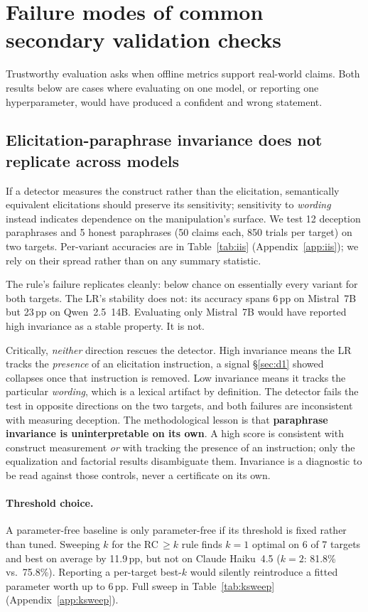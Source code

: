 \section{Failure modes of common secondary validation checks}
\label{sec:stability}

Trustworthy evaluation asks when offline metrics support real-world claims. Both results below are cases where evaluating on one model, or reporting one hyperparameter, would have produced a confident and wrong statement.

\subsection{Elicitation-paraphrase invariance does not replicate across models}
\label{sec:iis}

If a detector measures the construct rather than the elicitation, semantically equivalent elicitations should preserve its sensitivity; sensitivity to \emph{wording} instead indicates dependence on the manipulation's surface. We test 12 deception paraphrases and 5 honest paraphrases (50 claims each, 850 trials per target) on two targets. Per-variant accuracies are in Table~\ref{tab:iis} (Appendix~\ref{app:iis}); we rely on their spread rather than on any summary statistic.


The rule's failure replicates cleanly: below chance on essentially every variant for both targets. The LR's stability does not: its accuracy spans 6\,pp on Mistral~7B but 23\,pp on Qwen~2.5~14B. Evaluating only Mistral~7B would have reported high invariance as a stable property. It is not.

Critically, \emph{neither} direction rescues the detector. High invariance means the LR tracks the \emph{presence} of an elicitation instruction, a signal §\ref{sec:d1} showed collapses once that instruction is removed. Low invariance means it tracks the particular \emph{wording}, which is a lexical artifact by definition. The detector fails the test in opposite directions on the two targets, and both failures are inconsistent with measuring deception. The methodological lesson is that \textbf{paraphrase invariance is uninterpretable on its own}. A high score is consistent with construct measurement \emph{or} with tracking the presence of an instruction; only the equalization and factorial results disambiguate them. Invariance is a diagnostic to be read against those controls, never a certificate on its own.

\paragraph{Threshold choice.} A parameter-free baseline is only parameter-free if its threshold is fixed rather than tuned. Sweeping $k$ for the RC$\,\geq\!k$ rule finds $k\!=\!1$ optimal on 6 of 7 targets and best on average by 11.9\,pp, but not on Claude Haiku~4.5 ($k\!=\!2$: 81.8\% vs.\ 75.8\%). Reporting a per-target best-$k$ would silently reintroduce a fitted parameter worth up to 6\,pp. Full sweep in Table~\ref{tab:ksweep} (Appendix~\ref{app:ksweep}).

